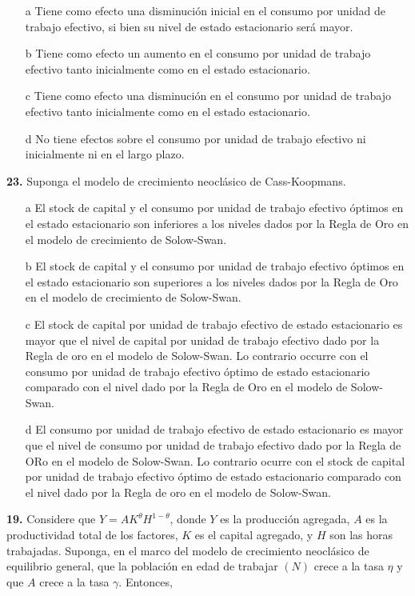 \documentclass{nuevotema}
\begin{document}
\begin{itemize}
	\item[a] Tiene como efecto una disminución inicial en el consumo por unidad de trabajo efectivo, si bien su nivel de estado estacionario será mayor.
	\item[b] Tiene como efecto un aumento en el consumo por unidad de trabajo efectivo tanto inicialmente como en el estado estacionario.
	\item[c] Tiene como efecto una disminución en el consumo por unidad de trabajo efectivo tanto inicialmente como en el estado estacionario.
	\item[d] No tiene efectos sobre el consumo por unidad de trabajo efectivo ni inicialmente ni en el largo plazo.
\end{itemize}

\textbf{23.} Suponga el modelo de crecimiento neoclásico de Cass-Koopmans.

\begin{itemize}
	\item[a] El stock de capital y el consumo por unidad de trabajo efectivo óptimos en el estado estacionario son inferiores a los niveles dados por la Regla de Oro en el modelo de crecimiento de Solow-Swan.
	\item[b] El stock de capital y el consumo por unidad de trabajo efectivo óptimos en el estado estacionario son superiores a los niveles dados por la Regla de Oro en el modelo de crecimiento de Solow-Swan.
	\item[c] El stock de capital por unidad de trabajo efectivo de estado estacionario es mayor que el nivel de capital por unidad de trabajo efectivo dado por la Regla de oro en el modelo de Solow-Swan. Lo contrario occurre con el consumo por unidad de trabajo efectivo óptimo de estado estacionario comparado con el nivel dado por la Regla de Oro en el modelo de Solow-Swan.
	\item[d] El consumo por unidad de trabajo efectivo de estado estacionario es mayor que el nivel de consumo por unidad de trabajo efectivo dado por la Regla de ORo en el modelo de Solow-Swan. Lo contrario ocurre con el stock de capital por unidad de trabajo efectivo óptimo de estado estacionario comparado con el nivel dado por la Regla de oro en el modelo de Solow-Swan.
\end{itemize}


\textbf{19.} Considere que $Y=A K^\theta H^{1-\theta}$, donde $Y$ es la producción agregada, $A$ es la productividad total de los factores, $K$ es el capital agregado, y $H$ son las horas trabajadas. Suponga, en el marco del modelo de crecimiento neoclásico de equilibrio general, que la población en edad de trabajar $(N)$ crece a la tasa $\eta$ y que $A$ crece a la tasa $\gamma$. Entonces,
\end{document}
